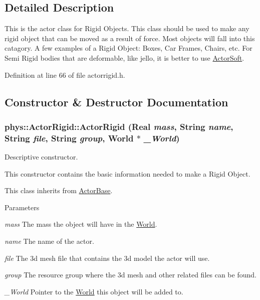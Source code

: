 \subsection{Detailed Description}
This is the actor class for Rigid Objects. This class should be used to make any rigid object that can be moved as a result of force. Most objects will fall into this catagory. A few examples of a Rigid Object: Boxes, Car Frames, Chairs, etc. For Semi Rigid bodies that are deformable, like jello, it is better to use \hyperlink{classphys_1_1ActorSoft}{ActorSoft}. 

Definition at line 66 of file actorrigid.h.



\subsection{Constructor \& Destructor Documentation}
\hypertarget{classphys_1_1ActorRigid_ac42c05745d57eb5745de3f34e820b72d}{
\subsubsection[{ActorRigid}]{\setlength{\rightskip}{0pt plus 5cm}phys::ActorRigid::ActorRigid ({\bf Real} {\em mass}, \/  {\bf String} {\em name}, \/  {\bf String} {\em file}, \/  {\bf String} {\em group}, \/  {\bf World} $\ast$ {\em \_\-World})}}
\label{d8/d71/classphys_1_1ActorRigid_ac42c05745d57eb5745de3f34e820b72d}


Descriptive constructor. 

This constructor contains the basic information needed to make a Rigid Object. \par
 This class inherits from \hyperlink{classphys_1_1ActorBase}{ActorBase}. 
\begin{DoxyParams}{Parameters}
\item[{\em mass}]The mass the object will have in the \hyperlink{classphys_1_1World}{World}. \item[{\em name}]The name of the actor. \item[{\em file}]The 3d mesh file that contains the 3d model the actor will use. \item[{\em group}]The resource group where the 3d mesh and other related files can be found. \item[{\em \_\-World}]Pointer to the \hyperlink{classphys_1_1World}{World} this object will be added to. \end{DoxyParams}


